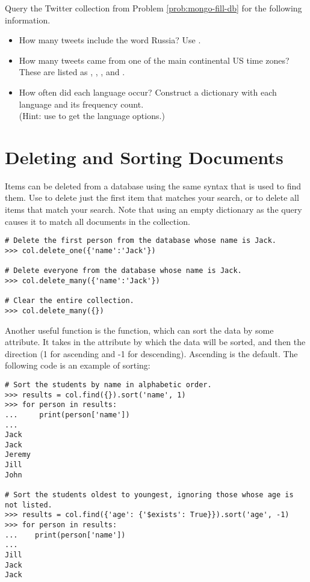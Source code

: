 \begin{problem}
Query the Twitter collection from Problem \ref{prob:mongo-fill-db} for the following information.
\begin{itemize}
    \item How many tweets include the word Russia? Use .
    \item How many tweets came from one of the main continental US time zones? These are listed as , , , and .
    \item How often did each language occur? Construct a dictionary with each language and its frequency count.
    \\(Hint: use  to get the language options.)
\end{itemize}
\end{problem}

\section*{Deleting and Sorting Documents}%

Items can be deleted from a database using the same syntax that is used to find them.
Use  to delete just the first item that matches your search, or  to delete all items that match your search.
Note that using an empty dictionary \li{\{\}} as the query causes it to match all documents in the collection.

\begin{lstlisting}
# Delete the first person from the database whose name is Jack.
>>> col.delete_one({'name':'Jack'})

# Delete everyone from the database whose name is Jack.
>>> col.delete_many({'name':'Jack'})

# Clear the entire collection.
>>> col.delete_many({})
\end{lstlisting}

Another useful function is the  function, which can sort the data by some attribute.
It takes in the attribute by which the data will be sorted, and then the direction (1 for ascending and -1 for descending).
Ascending is the default.
The following code is an example of sorting:

\begin{lstlisting}
# Sort the students by name in alphabetic order.
>>> results = col.find({}).sort('name', 1)
>>> for person in results:
...     print(person['name'])
...
Jack
Jack
Jeremy
Jill
John

# Sort the students oldest to youngest, ignoring those whose age is not listed.
>>> results = col.find({'age': {'$exists': True}}).sort('age', -1)
>>> for person in results:
...    print(person['name'])
...
Jill
Jack
Jack
\end{lstlisting}

